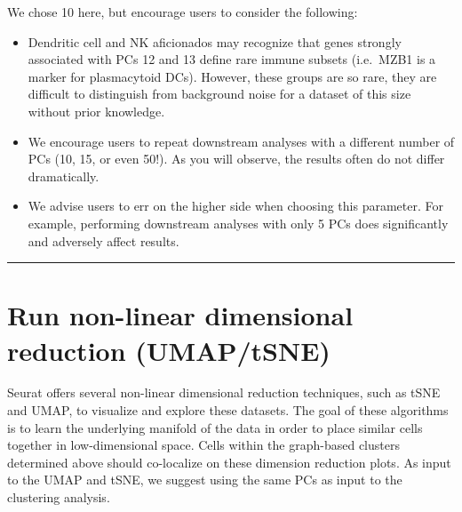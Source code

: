 \documentclass[
]{book}
\providecommand{\tightlist}{%
  \setlength{\itemsep}{0pt}\setlength{\parskip}{0pt}}
\begin{document}
We chose 10 here, but encourage users to consider the following:

\begin{itemize}
\tightlist
\item
  Dendritic cell and NK aficionados may recognize that genes strongly associated with PCs 12 and 13 define rare immune subsets (i.e.~MZB1 is a marker for plasmacytoid DCs). However, these groups are so rare, they are difficult to distinguish from background noise for a dataset of this size without prior knowledge.
\item
  We encourage users to repeat downstream analyses with a different number of PCs (10, 15, or even 50!). As you will observe, the results often do not differ dramatically.
\item
  We advise users to err on the higher side when choosing this parameter. For example, performing downstream analyses with only 5 PCs does significantly and adversely affect results.
\end{itemize}

\begin{center}\rule{0.5\linewidth}{0.5pt}\end{center}

\section{Run non-linear dimensional reduction (UMAP/tSNE)}\label{run-non-linear-dimensional-reduction-umaptsne}

Seurat offers several non-linear dimensional reduction techniques, such as tSNE and UMAP, to visualize and explore these datasets. The goal of these algorithms is to learn the underlying manifold of the data in order to place similar cells together in low-dimensional space. Cells within the graph-based clusters determined above should co-localize on these dimension reduction plots. As input to the UMAP and tSNE, we suggest using the same PCs as input to the clustering analysis.
\end{document}
